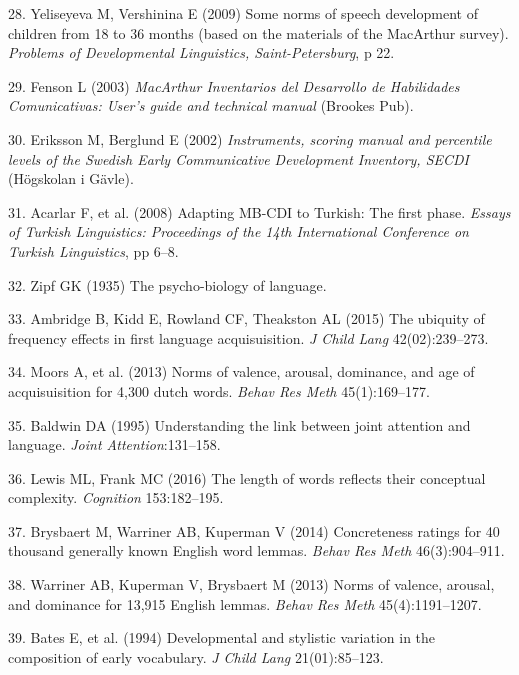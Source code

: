 \documentclass[english,man]{apa6}
\theoremstyle{definition}
\theoremstyle{definition}
\theoremstyle{definition}
\theoremstyle{remark}
\begin{document}
\hypertarget{ref-yeliseyeva2009}{}
28. Yeliseyeva M, Vershinina E (2009) Some norms of speech development
of children from 18 to 36 months (based on the materials of the
MacArthur survey). \emph{Problems of Developmental Linguistics,
Saint-Petersburg}, p 22.

\hypertarget{ref-fenson2003}{}
29. Fenson L (2003) \emph{MacArthur Inventarios del Desarrollo de
Habilidades Comunicativas: User's guide and technical manual} (Brookes
Pub).

\hypertarget{ref-eriksson2002}{}
30. Eriksson M, Berglund E (2002) \emph{Instruments, scoring manual and
percentile levels of the Swedish Early Communicative Development
Inventory, SECDI} (Högskolan i Gävle).

\hypertarget{ref-acarlar2008}{}
31. Acarlar F, et al. (2008) Adapting MB-CDI to Turkish: The first
phase. \emph{Essays of Turkish Linguistics: Proceedings of the 14th
International Conference on Turkish Linguistics}, pp 6--8.

\hypertarget{ref-zipf1935}{}
32. Zipf GK (1935) The psycho-biology of language.

\hypertarget{ref-ambridge2015}{}
33. Ambridge B, Kidd E, Rowland CF, Theakston AL (2015) The ubiquity of
frequency effects in first language acquisuisition. \emph{J Child Lang}
42(02):239--273.

\hypertarget{ref-moors2013}{}
34. Moors A, et al. (2013) Norms of valence, arousal, dominance, and age
of acquisuisition for 4,300 dutch words. \emph{Behav Res Meth}
45(1):169--177.

\hypertarget{ref-baldwin1995}{}
35. Baldwin DA (1995) Understanding the link between joint attention and
language. \emph{Joint Attention}:131--158.

\hypertarget{ref-lewis2016}{}
36. Lewis ML, Frank MC (2016) The length of words reflects their
conceptual complexity. \emph{Cognition} 153:182--195.

\hypertarget{ref-brysbaert2014}{}
37. Brysbaert M, Warriner AB, Kuperman V (2014) Concreteness ratings for
40 thousand generally known English word lemmas. \emph{Behav Res Meth}
46(3):904--911.

\hypertarget{ref-warriner2013}{}
38. Warriner AB, Kuperman V, Brysbaert M (2013) Norms of valence,
arousal, and dominance for 13,915 English lemmas. \emph{Behav Res Meth}
45(4):1191--1207.

\hypertarget{ref-bates1994}{}
39. Bates E, et al. (1994) Developmental and stylistic variation in the
composition of early vocabulary. \emph{J Child Lang} 21(01):85--123.
\end{document}
